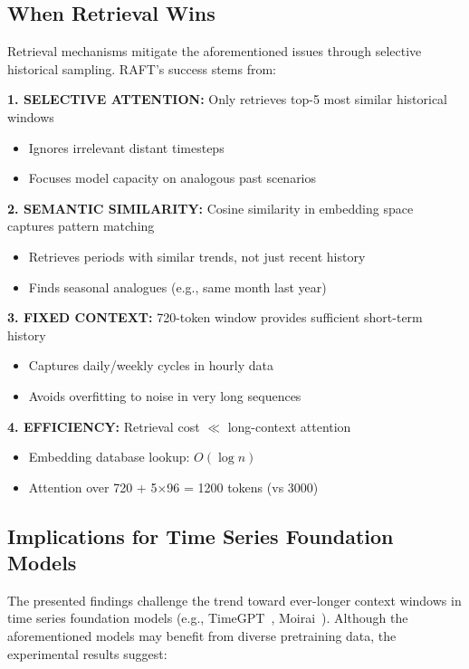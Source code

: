 \documentclass[10pt,twocolumn,letterpaper]{article}
\begin{document}
\subsection{When Retrieval Wins}

Retrieval mechanisms mitigate the aforementioned issues through selective historical sampling. RAFT's success stems from:

\noindent\textbf{1. SELECTIVE ATTENTION:} Only retrieves top-5 most similar historical windows
\begin{itemize}
    \item Ignores irrelevant distant timesteps
    \item Focuses model capacity on analogous past scenarios
\end{itemize}

\noindent\textbf{2. SEMANTIC SIMILARITY:} Cosine similarity in embedding space captures pattern matching
\begin{itemize}
    \item Retrieves periods with similar trends, not just recent history
    \item Finds seasonal analogues (e.g., same month last year)
\end{itemize}

\noindent\textbf{3. FIXED CONTEXT:} 720-token window provides sufficient short-term history
\begin{itemize}
    \item Captures daily/weekly cycles in hourly data
    \item Avoids overfitting to noise in very long sequences
\end{itemize}

\noindent\textbf{4. EFFICIENCY:} Retrieval cost $\ll$ long-context attention
\begin{itemize}
    \item Embedding database lookup: $O(\log n)$
    \item Attention over 720 + 5$\times$96 = 1200 tokens (vs 3000)
\end{itemize}

\subsection{Implications for Time Series Foundation Models}

The presented findings challenge the trend toward ever-longer context windows in time series foundation models (e.g., TimeGPT~\cite{timegpt}, Moirai~\cite{moirai}). Although the aforementioned models may benefit from diverse pretraining data, the experimental results suggest:
\end{document}
